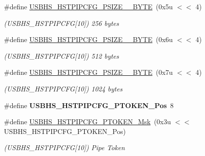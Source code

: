 \begin{DoxyCompactItemize}
\#define \mbox{\hyperlink{group__SAMV71__USBHS_ga8609c494ead12f66b21c1efb095173c5}{U\+S\+B\+H\+S\+\_\+\+H\+S\+T\+P\+I\+P\+C\+F\+G\+\_\+\+P\+S\+I\+Z\+E\+\_\+\_\+\+B\+Y\+TE}}~(0x5u $<$$<$ 4)
\begin{DoxyCompactList}\small\item\em (U\+S\+B\+H\+S\+\_\+\+H\+S\+T\+P\+I\+P\+C\+FG\mbox{[}10\mbox{]}) 256 bytes \end{DoxyCompactList}\item 
\mbox{\label{group__SAMV71__USBHS_gad28c4edde459d8b58d96f053b7cf402d}} 
\#define \mbox{\hyperlink{group__SAMV71__USBHS_gad28c4edde459d8b58d96f053b7cf402d}{U\+S\+B\+H\+S\+\_\+\+H\+S\+T\+P\+I\+P\+C\+F\+G\+\_\+\+P\+S\+I\+Z\+E\+\_\+\_\+\+B\+Y\+TE}}~(0x6u $<$$<$ 4)
\begin{DoxyCompactList}\small\item\em (U\+S\+B\+H\+S\+\_\+\+H\+S\+T\+P\+I\+P\+C\+FG\mbox{[}10\mbox{]}) 512 bytes \end{DoxyCompactList}\item 
\mbox{\label{group__SAMV71__USBHS_ga185427a2b04f2207df1e03b7da4728e4}} 
\#define \mbox{\hyperlink{group__SAMV71__USBHS_ga185427a2b04f2207df1e03b7da4728e4}{U\+S\+B\+H\+S\+\_\+\+H\+S\+T\+P\+I\+P\+C\+F\+G\+\_\+\+P\+S\+I\+Z\+E\+\_\+\_\+\+B\+Y\+TE}}~(0x7u $<$$<$ 4)
\begin{DoxyCompactList}\small\item\em (U\+S\+B\+H\+S\+\_\+\+H\+S\+T\+P\+I\+P\+C\+FG\mbox{[}10\mbox{]}) 1024 bytes \end{DoxyCompactList}\item 
\mbox{\label{group__SAMV71__USBHS_ga2d562fd233ad1cc2f8b5232c21c81b60}} 
\#define {\bfseries U\+S\+B\+H\+S\+\_\+\+H\+S\+T\+P\+I\+P\+C\+F\+G\+\_\+\+P\+T\+O\+K\+E\+N\+\_\+\+Pos}~8
\item 
\mbox{\label{group__SAMV71__USBHS_ga9160ad51dac584e665f3ff920817ff34}} 
\#define \mbox{\hyperlink{group__SAMV71__USBHS_ga9160ad51dac584e665f3ff920817ff34}{U\+S\+B\+H\+S\+\_\+\+H\+S\+T\+P\+I\+P\+C\+F\+G\+\_\+\+P\+T\+O\+K\+E\+N\+\_\+\+Msk}}~(0x3u $<$$<$ U\+S\+B\+H\+S\+\_\+\+H\+S\+T\+P\+I\+P\+C\+F\+G\+\_\+\+P\+T\+O\+K\+E\+N\+\_\+\+Pos)
\begin{DoxyCompactList}\small\item\em (U\+S\+B\+H\+S\+\_\+\+H\+S\+T\+P\+I\+P\+C\+FG\mbox{[}10\mbox{]}) Pipe Token \end{DoxyCompactList}\item 

\end{DoxyCompactItemize}
